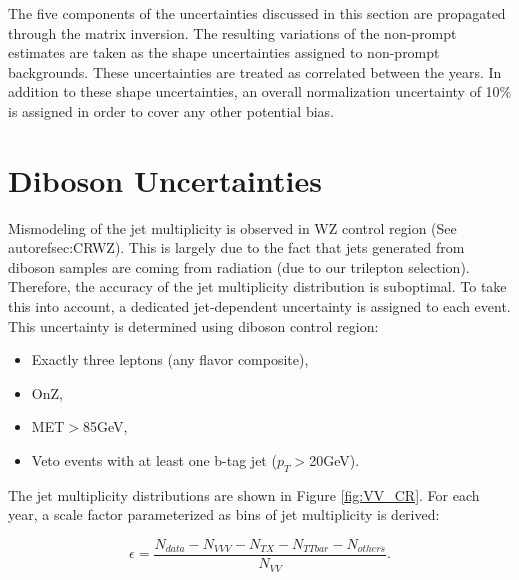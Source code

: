 The five components of the uncertainties discussed in this section are propagated through the matrix inversion. The resulting variations of the non-prompt estimates are taken as the shape uncertainties assigned to non-prompt backgrounds. These uncertainties are treated as correlated between the years. In addition to these shape uncertainties, an overall normalization uncertainty of 10$\%$ is assigned in order to cover any other potential bias.

\section{Diboson Uncertainties}
\label{sec:DiUnc}

Mismodeling of the jet multiplicity is observed in WZ control region (See autoref{sec:CRWZ}). This is largely due to the fact that jets generated from diboson samples are coming from radiation (due to our trilepton selection). Therefore, the accuracy of the jet multiplicity distribution is suboptimal. To take this into account, a dedicated jet-dependent uncertainty is assigned to each event. This uncertainty is determined using diboson control region:

\begin{itemize}
\item Exactly three leptons (any flavor composite),
\item OnZ,
\item MET$>$85GeV,
\item Veto events with at least one b-tag jet ($p_T>$20GeV).
\end{itemize}

The jet multiplicity distributions are shown in Figure \ref{fig:VV_CR}. For each year, a scale factor parameterized as bins of jet multiplicity is derived:

\begin{equation}
\epsilon=\frac{N_{data}-N_{VVV}-N_{TX}-N_{TTbar}-N_{others}}{N_{VV}}.
\end{equation}

